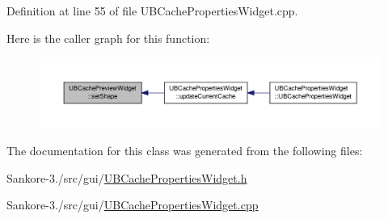 Definition at line 55 of file U\-B\-Cache\-Properties\-Widget.\-cpp.



Here is the caller graph for this function\-:
\nopagebreak
\begin{figure}[H]
\begin{center}
\leavevmode
\includegraphics[width=350pt]{dc/d24/class_u_b_cache_preview_widget_afee0642e27af49528330e8e33bfbce3b_icgraph}
\end{center}
\end{figure}




The documentation for this class was generated from the following files\-:\begin{DoxyCompactItemize}
\item 
Sankore-\/3./src/gui/\hyperlink{_u_b_cache_properties_widget_8h}{U\-B\-Cache\-Properties\-Widget.\-h}\item 
Sankore-\/3./src/gui/\hyperlink{_u_b_cache_properties_widget_8cpp}{U\-B\-Cache\-Properties\-Widget.\-cpp}\end{DoxyCompactItemize}
